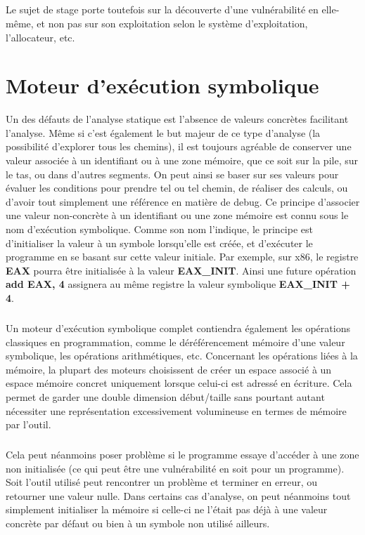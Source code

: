 \subparagraph{}
Le sujet de stage porte toutefois sur la découverte d'une vulnérabilité en elle-même, et non pas sur son exploitation selon
le système d'exploitation, l'allocateur, etc.

\section{Moteur d'exécution symbolique}
Un des défauts de l'analyse statique est l'absence de valeurs concrètes facilitant l'analyse. Même si c'est également
le but majeur de ce type d'analyse (la possibilité d'explorer tous les chemins), il est toujours agréable de conserver une valeur
associée à un identifiant ou à une zone mémoire, que ce soit sur la pile, sur le tas, ou dans d'autres segments. On peut ainsi se baser
sur ses valeurs pour évaluer les conditions pour prendre tel ou tel chemin, de réaliser des calculs, ou d'avoir tout simplement une référence en
matière de debug.
Ce principe d'associer une valeur non-concrète à un identifiant ou une zone mémoire est connu sous le nom d'exécution symbolique. Comme son nom
l'indique, le principe est d'initialiser la valeur à un symbole lorsqu'elle est créée, et d'exécuter le programme en se basant sur cette valeur initiale.
Par exemple, sur x86, le registre \textbf{EAX} pourra être initialisée à la valeur \textbf{EAX\_INIT}. Ainsi une future opération \textbf{add EAX, 4} assignera
au même registre la valeur symbolique \textbf{EAX\_INIT + 4}.

\subparagraph{}
Un moteur d'exécution symbolique complet contiendra également les opérations classiques en programmation, comme le déréférencement mémoire d'une valeur
symbolique, les opérations arithmétiques, etc. Concernant les opérations liées à la mémoire, la plupart des moteurs choisissent de créer un espace associé à
un espace mémoire concret uniquement lorsque celui-ci est adressé en écriture. Cela permet de garder une double dimension début/taille sans pourtant autant
nécessiter une représentation excessivement volumineuse en termes de mémoire par l'outil.
\subparagraph{}
Cela peut néanmoins poser problème si le programme essaye d'accéder à une
zone non initialisée (ce qui peut être une vulnérabilité en soit pour un programme). Soit l'outil utilisé peut rencontrer un problème et terminer en erreur,
ou retourner une valeur nulle. Dans certains cas d'analyse, on peut néanmoins tout simplement initialiser la mémoire si celle-ci ne l'était pas déjà à une valeur concrète
par défaut ou bien à un symbole non utilisé ailleurs.

